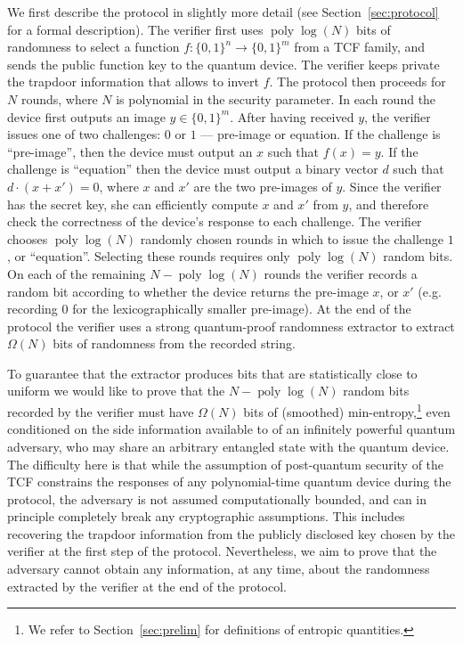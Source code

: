 \documentclass[11pt]{article}
\theoremstyle{remark}
\theoremstyle{definition}
\DeclareMathOperator{\poly}{poly}
\begin{document}
We first describe the protocol in slightly more detail (see Section~\ref{sec:protocol} for a formal description). The verifier first uses $\poly\log(N)$ bits of randomness to 
select a function $f:\{0,1\}^n \rightarrow \{0,1\}^m$ from a TCF family, and sends the public function key to the quantum device. The verifier keeps private the trapdoor information that allows to invert $f$.
The protocol then proceeds for $N$ rounds, where $N$ is polynomial in the security parameter. In each round the device first outputs an image $y \in \{0,1\}^m$. After having received $y$, the verifier issues one of two 
challenges: $0$ or $1$ --- pre-image or equation. If the challenge is ``pre-image'', then the device must output an $x$ such that $f(x) = y$. If the challenge is 
``equation'' then the device must output a binary vector $d$ such that $d\cdot(x + x') = 0$, where $x$ and $x'$ are the two pre-images of $y$. Since the verifier has the secret key, she can efficiently compute $x$ and $x'$ from $y$, and therefore check the correctness of the
device's response to each challenge. The verifier chooses 
$\poly\log(N)$ randomly chosen rounds in which to issue the challenge $1$, or ``equation''. Selecting these rounds requires only
$\poly\log(N)$ random bits. On each of the remaining $N - \poly\log(N)$ rounds the verifier records a random bit according to 
whether the device returns the pre-image $x$, or $x'$ (e.g. recording $0$ for the lexicographically smaller pre-image). At the end of the protocol the verifier
uses a strong quantum-proof randomness extractor to extract $\Omega(N)$ bits of randomness from the recorded string. 

To guarantee that the extractor produces bits that are statistically close to uniform we would like to prove that the $N - \poly\log(N)$ random bits recorded by the verifier must have  $\Omega(N)$ bits of (smoothed) min-entropy,\footnote{We refer to Section~\ref{sec:prelim} for definitions of entropic quantities.} even conditioned on the side information available to of an infinitely powerful quantum adversary, who may share an arbitrary entangled state with
the quantum device. The difficulty here is that while the assumption of  post-quantum security of the TCF constrains the responses of any polynomial-time quantum device during the
protocol, the adversary is not assumed computationally bounded, and can in principle completely break any cryptographic assumptions. This includes recovering the trapdoor information from the publicly disclosed key chosen by the verifier at the first step of the protocol. Nevertheless, we aim to prove that the adversary cannot obtain any information, at any time, about the randomness extracted by the verifier at the end of the protocol. 
\end{document}
